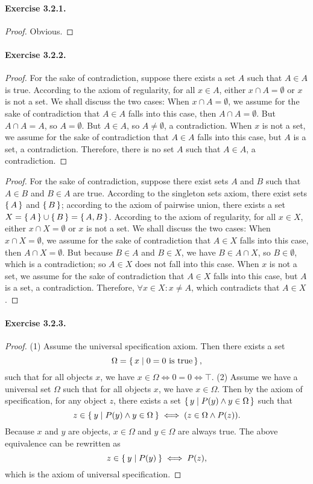 \paragraph{Exercise 3.2.1.}
\begin{proof}
    Obvious.
\end{proof}

\paragraph{Exercise 3.2.2.}
\begin{proof}
    For the sake of contradiction, suppose there exists a set $A$ such that $A\in A$ is true. According to the axiom of regularity, for all $x\in A$, either $x\cap A = \emptyset$ or $x$ is not a set. We shall discuss the two cases: When $x\cap A = \emptyset$, we assume for the sake of contradiction that $A\in A$ falls into this case, then $A\cap A = \emptyset$. But $A\cap A = A$, so $A=\emptyset$. But $A\in A$, so $A\neq \emptyset$, a contradiction. When $x$ is not a set, we assume for the sake of contradiction that $A\in A$ falls into this case, but $A$ is a set, a contradiction. Therefore, there is no set $A$ such that $A\in A$, a contradiction.
\end{proof}
\begin{proof}
    For the sake of contradiction, suppose there exist sets $A$ and $B$ such that $A\in B$ and $B\in A$ are true. According to the singleton sets axiom, there exist sets $\set{A}$ and $\set{B}$; according to the axiom of pairwise union, there exists a set $X=\set{A}\cup\set{B}=\set{A,B}$. According to the axiom of regularity, for all $x\in X$, either $x\cap X = \emptyset$ or $x$ is not a set.
    We shall discuss the two cases: When $x\cap X = \emptyset$, we assume for the sake of contradiction that $A\in X$ falls into this case, then $A\cap X = \emptyset$. But because $B\in A$ and $B\in X$, we have $B\in A\cap X$, so $B\in \emptyset$, which is a contradiction; so $A\in X$ does not fall into this case. When $x$ is not a set, we assume for the sake of contradiction that $A\in X$ falls into this case, but $A$ is a set, a contradiction. Therefore, $\forall x\in X: x\neq A$, which contradicts that $A\in X$.
\end{proof}

\paragraph{Exercise 3.2.3.}
\begin{proof}
    (1) Assume the universal specification axiom. Then there exists a set \[\Omega = \set{x|0=0\text{ is true}},\] such that for all objects $x$, we have $x\in \Omega \iff 0=0 \iff \top$.
    (2) Assume we have a universal set $\Omega$ such that for all objects $x$, we have $x\in \Omega$. Then by the axiom of specification, for any object $z$, there exists a set $\set{y | P(y) \land y\in\Omega}$ such that \[z\in \Set{y | P(y) \land y\in\Omega} \iff (z\in \Omega \land P(z)).\] Because $x$ and $y$ are objects, $x\in\Omega$ and $y\in\Omega$ are always true. The above equivalence can be rewritten as \[z\in \Set{y | P(y)} \iff P(z),\] which is the axiom of universal specification.
\end{proof}

